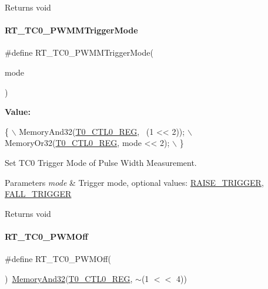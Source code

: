 \begin{DoxyReturn}{Returns}
void 
\end{DoxyReturn}
\mbox{\label{a00041_a48f8c6b4e5fba0057564f92060449557}} 
\paragraph{\texorpdfstring{R\+T\+\_\+\+T\+C0\+\_\+\+P\+W\+M\+M\+Trigger\+Mode}{RT\_TC0\_PWMMTriggerMode}}
{\footnotesize\ttfamily \#define R\+T\+\_\+\+T\+C0\+\_\+\+P\+W\+M\+M\+Trigger\+Mode(\begin{DoxyParamCaption}\item[{}]{mode }\end{DoxyParamCaption})}

{\bfseries Value\+:}
\begin{DoxyCode}
\{                                        \(\backslash\)
        MemoryAnd32(\mbox{\hyperlink{a00020_ac94b0659ef32086a6752672082c0b3ed}{T0\_CTL0\_REG}}, ~(1 << 2)); \(\backslash\)
        MemoryOr32(\mbox{\hyperlink{a00020_ac94b0659ef32086a6752672082c0b3ed}{T0\_CTL0\_REG}}, mode << 2);  \(\backslash\)
    \}
\end{DoxyCode}


Set T\+C0 Trigger Mode of Pulse Width Measurement. 


\begin{DoxyParams}{Parameters}
{\em mode} & Trigger mode, optional values\+: \mbox{\hyperlink{a00020_abda90eda34a640b130f48a6ade23fe22}{R\+A\+I\+S\+E\+\_\+\+T\+R\+I\+G\+G\+ER}}, \mbox{\hyperlink{a00020_a9bbaf5b9e2125c7597249c7113b20e6c}{F\+A\+L\+L\+\_\+\+T\+R\+I\+G\+G\+ER}} \\
\hline
\end{DoxyParams}
\begin{DoxyReturn}{Returns}
void 
\end{DoxyReturn}
\mbox{\label{a00041_a043d535ff9aad665ddf1521169a0f187}} 
\paragraph{\texorpdfstring{R\+T\+\_\+\+T\+C0\+\_\+\+P\+W\+M\+Off}{RT\_TC0\_PWMOff}}
{\footnotesize\ttfamily \#define R\+T\+\_\+\+T\+C0\+\_\+\+P\+W\+M\+Off(\begin{DoxyParamCaption}{ }\end{DoxyParamCaption})~\mbox{\hyperlink{a00020_ad87cedffcaadc51db22594fce55173d4}{Memory\+And32}}(\mbox{\hyperlink{a00020_ac94b0659ef32086a6752672082c0b3ed}{T0\+\_\+\+C\+T\+L0\+\_\+\+R\+EG}}, $\sim$(1 $<$$<$ 4))}



